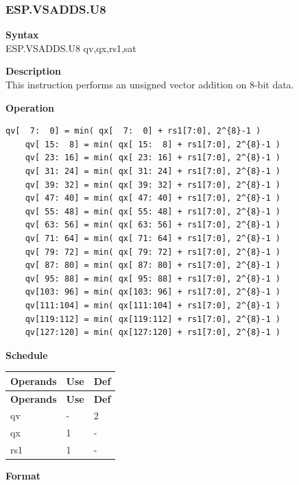\newpage
\subsubsection{ESP.VSADDS.U8}\label{instruction:ESPVSADDSU8}
\textbf{Syntax}\\
ESP.VSADDS.U8 qv,qx,rs1,sat

\textbf{Description}\\
This instruction performs an unsigned vector addition on 8-bit data.

\textbf{Operation}\\
\begin{lstlisting}[escapeinside=`?]
    qv[  7:  0] = min( qx[  7:  0] + rs1[7:0], 2^{8}-1 )
    qv[ 15:  8] = min( qx[ 15:  8] + rs1[7:0], 2^{8}-1 )
    qv[ 23: 16] = min( qx[ 23: 16] + rs1[7:0], 2^{8}-1 )
    qv[ 31: 24] = min( qx[ 31: 24] + rs1[7:0], 2^{8}-1 )
    qv[ 39: 32] = min( qx[ 39: 32] + rs1[7:0], 2^{8}-1 )
    qv[ 47: 40] = min( qx[ 47: 40] + rs1[7:0], 2^{8}-1 )
    qv[ 55: 48] = min( qx[ 55: 48] + rs1[7:0], 2^{8}-1 )
    qv[ 63: 56] = min( qx[ 63: 56] + rs1[7:0], 2^{8}-1 )
    qv[ 71: 64] = min( qx[ 71: 64] + rs1[7:0], 2^{8}-1 )
    qv[ 79: 72] = min( qx[ 79: 72] + rs1[7:0], 2^{8}-1 )
    qv[ 87: 80] = min( qx[ 87: 80] + rs1[7:0], 2^{8}-1 )
    qv[ 95: 88] = min( qx[ 95: 88] + rs1[7:0], 2^{8}-1 )
    qv[103: 96] = min( qx[103: 96] + rs1[7:0], 2^{8}-1 )
    qv[111:104] = min( qx[111:104] + rs1[7:0], 2^{8}-1 )
    qv[119:112] = min( qx[119:112] + rs1[7:0], 2^{8}-1 )
    qv[127:120] = min( qx[127:120] + rs1[7:0], 2^{8}-1 )
\end{lstlisting}


\textbf{Schedule}\\
\begin{longtable}[c]{|l|l|l|}
    \hline
    \rowcolor{lightgray}
    \textbf{Operands} & \textbf{Use} & \textbf{Def} \\\hline
    \endfirsthead
    \hline
    \rowcolor{lightgray}
     \textbf{Operands} & \textbf{Use} & \textbf{Def} \\\hline
    \endhead
    \hline
    \endfoot

  qv & - & 2 \\\hline
    qx & 1 & - \\\hline
    rs1 & 1 & -

\end{longtable}

\textbf{Format}\\


